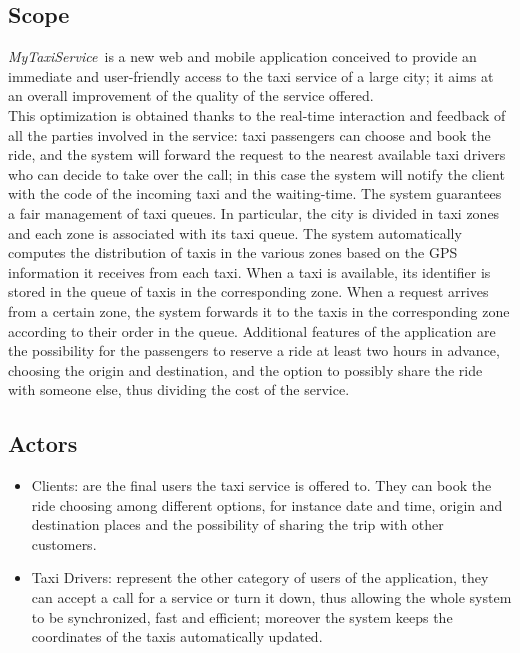 \documentclass[a4paper,11pt]{report} %
\newcommand{\mts}{\mbox{\normalfont\itshape MyTaxiService\ }}
\begin{document}
	\subsection{Scope} \mts is a new web and mobile application conceived to provide an immediate and user-friendly access to the taxi service of a large city; it aims at an overall improvement of the quality of the service offered.\\
	This optimization is obtained thanks to the real-time interaction and feedback of all the parties involved in the service: taxi passengers can choose and book the ride, and the system will forward the request to the nearest available taxi drivers who can decide to take over the call; in this case the system will notify the client with the code of the incoming taxi and the waiting-time.
	The	system	guarantees a fair management of taxi queues. In particular, the city is divided in taxi zones and each zone is associated with its taxi queue. The system automatically computes the distribution of taxis in the various zones based on the GPS information it receives from each taxi. When a taxi is available, its identifier is stored in the queue of taxis in the corresponding zone. When a request arrives from a certain zone, the system forwards it to the taxis in the corresponding zone according to their order in the queue.
	Additional features of the application are the possibility for the passengers to reserve a ride at least two hours in advance, choosing the origin and destination, and the option to possibly share the ride with someone else, thus dividing the cost of the service.
	
	\subsection{Actors}
		\begin{itemize}
			\item Clients: are the final users the taxi service is offered to. They can book the ride choosing among different options, for instance date and time, origin and destination places and the possibility of sharing the trip with other customers.
			\item Taxi Drivers: represent the other category of users of the application, they can accept a call for a service or turn it down, thus allowing the whole system to be synchronized, fast and efficient; moreover the system keeps the coordinates of the taxis automatically updated.
		\end{itemize}
	
\end{document}
